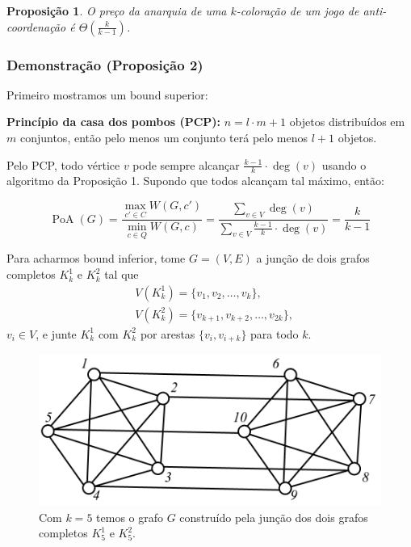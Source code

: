 \documentclass{beamer}
\DeclareMathOperator*{\PoA}{\text{PoA}}
\theoremstyle{plain}
\newtheorem{proposition}{Proposição}
\begin{document}
\begin{frame}
  \begin{proposition}
    O preço da anarquia de uma $k$-coloração de um jogo de anti-coordenação é $\Theta\left(
    \frac{k}{k-1}\right)$.
  \end{proposition}
\end{frame}

\begin{frame}
  \frametitle{Demonstração (Proposição 2)}

  Primeiro mostramos um bound superior:

  \textbf{Princípio da casa dos pombos (PCP):} $n=l\cdot m+1$ objetos distribuídos em $m$
  conjuntos, então pelo menos um conjunto terá pelo menos $l+1$ objetos.

  Pelo PCP, todo vértice $v$ pode sempre alcançar $\frac{k-1}{k}\cdot\deg(v)$ usando o
  algoritmo da Proposição 1. Supondo que todos alcançam tal máximo, então:

  \begin{equation*}
    \PoA(G)=\frac{\max_{c'\in C} W(G,c')}{\min_{c\in Q}W(G,c)}=\frac{\sum_{v\in
      V}\deg(v)}{\sum_{v\in V}\frac{k-1}{k}\cdot\deg(v)}=\frac{k}{k-1}
  \end{equation*}
\end{frame}

\begin{frame}
  Para acharmos bound inferior, tome $G=(V,E)$ a junção de dois grafos completos $K^1_k$ e $K^2_k$
  tal que
  \begin{align*}
    &V(K^1_k) = \{v_1,v_2,\ldots,v_k\},\\
    &V(K^2_k) = \{v_{k+1},v_{k+2},\ldots,v_{2k}\},
  \end{align*}
  $v_i\in V$, e junte $K^1_k$ com $K^2_k$ por arestas $\{v_i,v_{i+k}\}$ para todo $k$.
  \begin{figure}[h]
    \centering\includegraphics[scale=0.35]{imgs/k5.png}
    \captionsetup{justification=raggedright}
    \caption{Com $k=5$ temos o grafo $G$ construído pela junção dos dois grafos completos $K^1_5$ e
    $K^2_5$.~\cite{kun-et-al}}
  \end{figure}
\end{frame}
\end{document}
